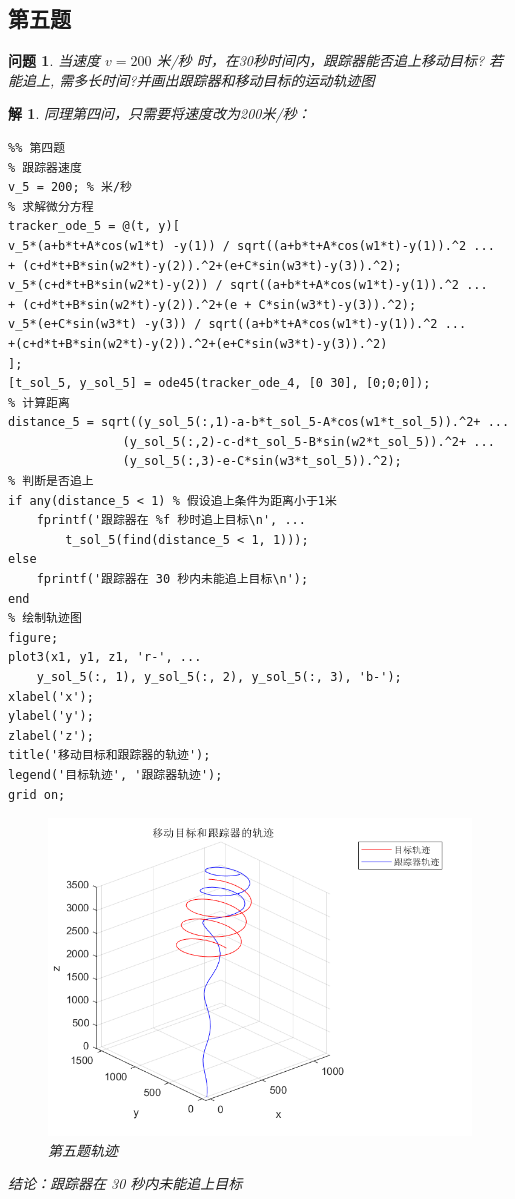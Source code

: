 \documentclass[a4paper, 12pt]{ctexart}
\newtheorem*{theorem}{解}
\newtheorem*{example}{问题}
\begin{document}
\subsection{第五题}

\begin{example}
    当速度 $v=200$ 米/秒 时，在30秒时间内，跟踪器能否追上移动目标? 若能追上,
    需多长时间?并画出跟踪器和移动目标的运动轨迹图
\end{example}

\begin{theorem}
    同理第四问，只需要将速度改为200米/秒：
\begin{lstlisting}
%% 第四题
% 跟踪器速度
v_5 = 200; % 米/秒
% 求解微分方程
tracker_ode_5 = @(t, y)[
v_5*(a+b*t+A*cos(w1*t) -y(1)) / sqrt((a+b*t+A*cos(w1*t)-y(1)).^2 ...
+ (c+d*t+B*sin(w2*t)-y(2)).^2+(e+C*sin(w3*t)-y(3)).^2);
v_5*(c+d*t+B*sin(w2*t)-y(2)) / sqrt((a+b*t+A*cos(w1*t)-y(1)).^2 ...
+ (c+d*t+B*sin(w2*t)-y(2)).^2+(e + C*sin(w3*t)-y(3)).^2);
v_5*(e+C*sin(w3*t) -y(3)) / sqrt((a+b*t+A*cos(w1*t)-y(1)).^2 ...
+(c+d*t+B*sin(w2*t)-y(2)).^2+(e+C*sin(w3*t)-y(3)).^2)
];
[t_sol_5, y_sol_5] = ode45(tracker_ode_4, [0 30], [0;0;0]);
% 计算距离
distance_5 = sqrt((y_sol_5(:,1)-a-b*t_sol_5-A*cos(w1*t_sol_5)).^2+ ...
                (y_sol_5(:,2)-c-d*t_sol_5-B*sin(w2*t_sol_5)).^2+ ...
                (y_sol_5(:,3)-e-C*sin(w3*t_sol_5)).^2);
% 判断是否追上
if any(distance_5 < 1) % 假设追上条件为距离小于1米
    fprintf('跟踪器在 %f 秒时追上目标\n', ...
        t_sol_5(find(distance_5 < 1, 1)));
else
    fprintf('跟踪器在 30 秒内未能追上目标\n');
end
% 绘制轨迹图
figure;
plot3(x1, y1, z1, 'r-', ...
    y_sol_5(:, 1), y_sol_5(:, 2), y_sol_5(:, 3), 'b-');
xlabel('x');
ylabel('y');
zlabel('z');
title('移动目标和跟踪器的轨迹');
legend('目标轨迹', '跟踪器轨迹');
grid on;
\end{lstlisting}
\begin{figure}[h]
    \centering
    \includegraphics[width=5in]{pic/t5.png}
    \caption*{第五题轨迹}
\end{figure}
结论：跟踪器在 30 秒内未能追上目标
\end{theorem}
\end{document}
